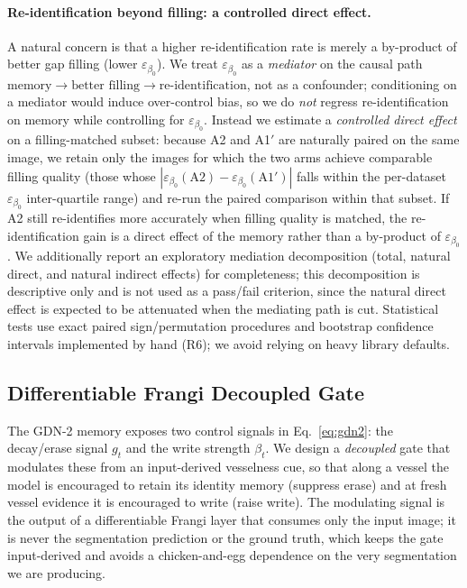 \paragraph{Re-identification beyond filling: a controlled direct effect.}
A natural concern is that a higher re-identification rate is merely a by-product of
better gap filling (lower $\varepsilon_{\beta_0}$). We treat $\varepsilon_{\beta_0}$
as a \emph{mediator} on the causal path
$\text{memory} \rightarrow \text{better filling} \rightarrow \text{re-identification}$,
not as a confounder; conditioning on a mediator would induce over-control bias, so we
do \emph{not} regress re-identification on memory while controlling for
$\varepsilon_{\beta_0}$. Instead we estimate a \emph{controlled direct effect} on a
filling-matched subset: because A2 and A1$'$ are naturally paired on the same image, we
retain only the images for which the two arms achieve comparable filling quality
(those whose $|\varepsilon_{\beta_0}(\mathrm{A2}) -
\varepsilon_{\beta_0}(\mathrm{A1}')|$ falls within the per-dataset
$\varepsilon_{\beta_0}$ inter-quartile range) and re-run the paired comparison within
that subset. If A2 still re-identifies more accurately when filling quality is matched,
the re-identification gain is a direct effect of the memory rather than a by-product of
$\varepsilon_{\beta_0}$. We additionally report an exploratory mediation decomposition
(total, natural direct, and natural indirect effects) for completeness; this
decomposition is descriptive only and is not used as a pass/fail criterion, since the
natural direct effect is expected to be attenuated when the mediating path is cut.
Statistical tests use exact paired sign/permutation procedures and bootstrap
confidence intervals implemented by hand (R6); we avoid relying on heavy library
defaults.

\subsection{Differentiable Frangi Decoupled Gate}
\label{sec:method:frangi}

The GDN-2 memory exposes two control signals in Eq.~\eqref{eq:gdn2}: the decay/erase
signal $g_t$ and the write strength $\beta_t$. We design a \emph{decoupled} gate that
modulates these from an input-derived vesselness cue, so that along a vessel the model
is encouraged to retain its identity memory (suppress erase) and at fresh vessel
evidence it is encouraged to write (raise write). The modulating signal is the output
of a differentiable Frangi layer that consumes only the input image; it is never the
segmentation prediction or the ground truth, which keeps the gate input-derived and
avoids a chicken-and-egg dependence on the very segmentation we are producing.

